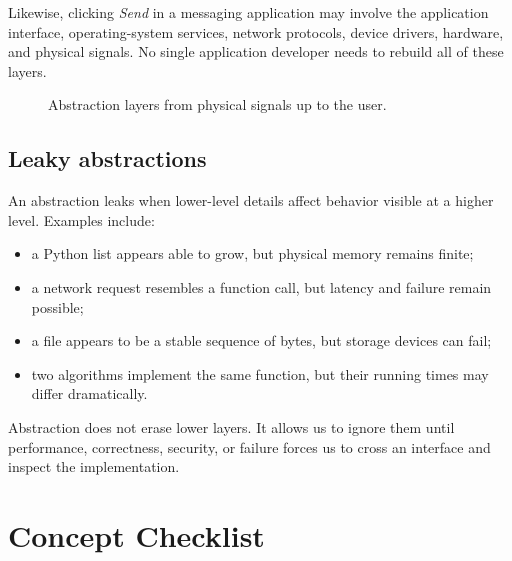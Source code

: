 \documentclass[11pt]{article}
\begin{document}
Likewise, clicking \emph{Send} in a messaging application may involve the application interface, operating-system services, network protocols, device drivers, hardware, and physical signals. No single application developer needs to rebuild all of these layers.

\begin{figure}[htbp]
  \centering
  
  \caption{Abstraction layers from physical signals up to the user.}
\end{figure}

\subsection{Leaky abstractions}

An abstraction leaks when lower-level details affect behavior visible at a higher level. Examples include:
\begin{itemize}
  \item a Python list appears able to grow, but physical memory remains finite;
  \item a network request resembles a function call, but latency and failure remain possible;
  \item a file appears to be a stable sequence of bytes, but storage devices can fail;
  \item two algorithms implement the same function, but their running times may differ dramatically.
\end{itemize}
Abstraction does not erase lower layers. It allows us to ignore them until performance, correctness, security, or failure forces us to cross an interface and inspect the implementation.

\section{Concept Checklist}
\end{document}
